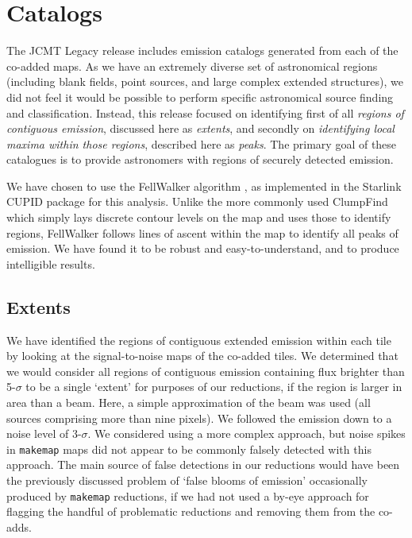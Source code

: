 \documentclass[twocolumn,times]{aastex6}
\begin{document}
\section{Catalogs}
\label{sec:cat}
The JCMT Legacy release includes emission catalogs generated from
each of the co-added maps. As we have an extremely diverse set of
astronomical regions (including blank fields, point sources, and large
complex extended structures), we did not feel it would be possible to
perform specific astronomical source finding and
classification. Instead, this release focused on identifying first of
all \emph{regions of contiguous emission}, discussed here as
\emph{extents}, and secondly on \emph{identifying local maxima within
  those regions}, described here as \emph{peaks}. The primary goal of
these catalogues is to provide astronomers with regions of securely
detected emission.


We have chosen to use the FellWalker algorithm \citep{Berry2015}, as
implemented in the Starlink CUPID \citep{cupid} package for this
analysis. Unlike the more commonly used ClumpFind which simply lays
discrete contour levels on the map and uses those to identify regions,
FellWalker follows lines of ascent within the map to identify all
peaks of emission. We have found it to be robust and
easy-to-understand, and to produce intelligible results.

\subsection{Extents}
\label{sec:extents}
We have identified the regions of contiguous extended emission within
each tile by looking at the signal-to-noise maps of the co-added
tiles. We determined that we would consider all regions of contiguous
emission containing flux brighter than 5-$\sigma$ to be a single `extent'
for purposes of our reductions, if the region is larger in area than a
beam.  Here, a simple approximation of the beam was used (all sources
comprising more than nine pixels). We followed the emission down to a noise level
of 3-$\sigma$. We considered using a more complex approach, but noise
spikes in \texttt{makemap} maps did not appear to be commonly falsely detected
with this approach. The main source of false detections in our
reductions would have been the previously discussed problem of `false
blooms of emission' occasionally produced by \texttt{makemap} reductions, if we
had not used a by-eye approach for flagging the handful of problematic
reductions and removing them from the co-adds.
\end{document}
